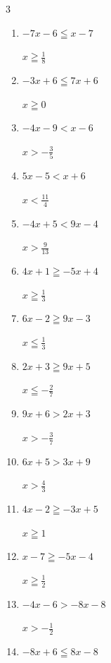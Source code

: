 \begin{multicols}{3}
\begin{enumerate}
        $\displaystyle x\leqq -\frac{17}{6}$

  \item $-7x-6\leqq x-7$

        $\displaystyle x\geqq \frac{1}{8}$

\columnbreak %

  \item $-3x+6\leqq 7x+6$

        $\displaystyle x\geqq 0$

  \item $-4x-9<x-6$

        $\displaystyle x>-\frac{3}{5}$

  \item $5x-5<x+6$

        $\displaystyle x<\frac{11}{4}$

  \item $-4x+5<9x-4$

        $\displaystyle x>\frac{9}{13}$

  \item $4x+1\geqq -5x+4$

        $\displaystyle x\geqq \frac{1}{3}$

  \item $6x-2\geqq 9x-3$

        $\displaystyle x\leqq \frac{1}{3}$

  \item $2x+3\geqq 9x+5$

        $\displaystyle x\leqq -\frac{2}{7}$

  \item $9x+6>2x+3$

        $\displaystyle x>-\frac{3}{7}$

  \item $6x+5>3x+9$

        $\displaystyle x>\frac{4}{3}$

  \item $4x-2\geqq -3x+5$

        $\displaystyle x\geqq 1$

  \item $x-7\geqq -5x-4$

        $\displaystyle x\geqq \frac{1}{2}$

  \item $-4x-6>-8x-8$

        $\displaystyle x>-\frac{1}{2}$

  \item $-8x+6\leqq 8x-8$


\end{enumerate}
\end{multicols}

